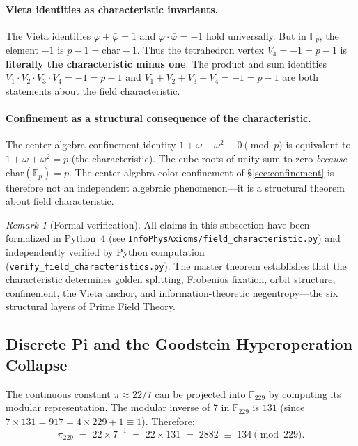 \documentclass[12pt,oneside]{article}
\theoremstyle{principia}
\theoremstyle{definition}
\theoremstyle{remark}
\newtheorem{remark}[theorem]{Remark}
\begin{document}
\paragraph{Vieta identities as characteristic invariants.}
The Vieta identities $\varphi + \bar\varphi = 1$ and $\varphi \cdot \bar\varphi = -1$ hold universally. But in $\mathbb{F}_p$, the element $-1$ is $p - 1 = \mathrm{char} - 1$. Thus the tetrahedron vertex $V_4 = -1 = p - 1$ is \textbf{literally the characteristic minus one}. The product and sum identities $V_1 \cdot V_2 \cdot V_3 \cdot V_4 = -1 = p - 1$ and $V_1 + V_2 + V_3 + V_4 = -1 = p - 1$ are both statements about the field characteristic.

\paragraph{Confinement as a structural consequence of the characteristic.}
The center-algebra confinement identity $1 + \omega + \omega^2 \equiv 0 \pmod{p}$ is equivalent to $1 + \omega + \omega^2 = p$ (the characteristic). The cube roots of unity sum to zero \emph{because} $\mathrm{char}(\mathbb{F}_p) = p$. The center-algebra color confinement of \S\ref{sec:confinement} is therefore not an independent algebraic phenomenon---it is a structural theorem about field characteristic.

\begin{remark}[Formal verification]
All claims in this subsection have been formalized in Python~4 (see \texttt{InfoPhysAxioms/field\_characteristic.py}) and independently verified by Python computation (\texttt{verify\_field\_characteristics.py}). The master theorem establishes that the characteristic determines golden splitting, Frobenius fixation, orbit structure, confinement, the Vieta anchor, and information-theoretic negentropy---the six structural layers of Prime Field Theory.
\end{remark}

\subsection{Discrete Pi and the Goodstein Hyperoperation Collapse}
\label{sec:pi_hyperops}

The continuous constant $\pi \approx 22/7$ can be projected into $\mathbb{F}_{229}$ by computing its modular representation. The modular inverse of $7$ in $\mathbb{F}_{229}$ is $131$ (since $7 \times 131 = 917 = 4 \times 229 + 1 \equiv 1$). Therefore:
\[
\pi_{229} \;=\; 22 \times 7^{-1} \;=\; 22 \times 131 \;=\; 2882 \;\equiv\; 134 \pmod{229}.
\]
\end{document}
